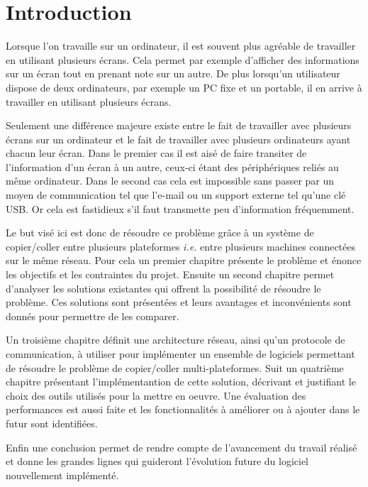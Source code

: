 \chapter*{Introduction}
\renewcommand{\leftmark}{INTRODUCTION}

Lorsque l'on travaille sur un ordinateur, il est souvent plus agréable
de travailler en utilisant plusieurs écrans. Cela permet par exemple
d'afficher des informations sur un écran tout en prenant note sur un autre.
De plus lorsqu'un utilisateur dispose de deux ordinateurs, par exemple
un PC fixe et un portable, il en arrive à travailler en utilisant plusieurs
écrans.

Seulement une différence majeure existe entre le fait de travailler
avec plusieurs écrans sur un ordinateur et le fait de travailler avec
plusieurs ordinateurs ayant chacun leur écran. Dans le premier cas il est
aisé de faire transiter de l'information d'un écran à un autre, ceux-ci
étant des périphériques reliés au même ordinateur. Dans le second cas
cela est impossible sans passer par un moyen de communication tel que l'e-mail
ou un support externe tel qu'une clé USB. Or cela est fastidieux
s'il faut transmette peu d'information fréquemment.

Le but visé ici est donc de résoudre ce problème grâce
à un système de copier/coller entre plusieurs plateformes \emph{i.e.} entre
plusieurs machines connectées sur le même réseau.
Pour cela un premier chapitre présente le problème et énonce
les objectifs et les contraintes du projet. Ensuite un second chapitre
permet d'analyser les solutions existantes qui offrent la possibilité de
résoudre le problème. Ces solutions sont présentées et leurs avantages et
inconvénients sont donnés pour permettre de les comparer.

Un troisième chapitre
définit une architecture réseau, ainsi qu'un protocole de
communication, à utiliser pour implémenter un ensemble de logiciels
permettant de résoudre le problème de copier/coller multi-plateformes.
Suit un quatrième chapitre présentant l'implémentantion de cette solution,
décrivant et justifiant le choix des outils utilisés pour la mettre en
oeuvre. Une évaluation des performances est aussi faite et les
fonctionnalités à améliorer ou à ajouter dans le futur sont identifiées.

Enfin une conclusion permet de rendre compte de l'avancement du travail
réalisé et donne les grandes lignes qui guideront l'évolution future
du logiciel nouvellement implémenté.